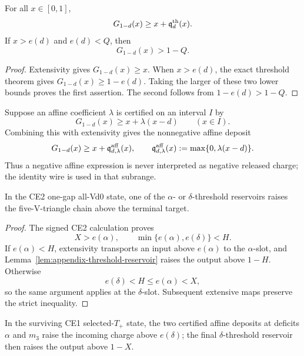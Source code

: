 \begin{lemma}
\label{lem:appendix-threshold-reservoir}
For all \(x\in[0,1]\),
\begin{equation}
 G_{1-d}(x)
 \ge x+\mathfrak q_d^{\rm th}(x).
 \label{eq:appendix-threshold-reservoir}
\end{equation}
If \(x>e(d)\) and \(e(d)<Q\), then
\[
 G_{1-d}(x)>1-Q.
\]
\end{lemma}

\begin{proof}
Extensivity gives \(G_{1-d}(x)\ge x\).  When \(x>e(d)\), the exact threshold
theorem gives \(G_{1-d}(x)\ge1-e(d)\).  Taking the larger of these two lower
bounds proves the first assertion.  The second follows from
\(1-e(d)>1-Q\).
\end{proof}

Suppose an affine coefficient \(\lambda\) is certified on an interval
\(I\) by
\[
 G_{1-d}(x)\ge x+\lambda(x-d)
 \qquad(x\in I).
\]
Combining this with extensivity gives the nonnegative affine deposit
\begin{equation}
 G_{1-d}(x)
 \ge x+\mathfrak q_{d,\lambda}^{\rm aff}(x),
 \qquad
 \mathfrak q_{d,\lambda}^{\rm aff}(x)
 :=\max\{0,\lambda(x-d)\}.
 \label{eq:appendix-affine-deposit}
\end{equation}
Thus a negative affine expression is never interpreted as negative released
charge; the identity wire is used in that subrange.

\begin{proposition}
\label{prop:appendix-ce2-one-hit-discharge}
In the CE2 one-gap all-Vd0 state, one of the \(\alpha\)- or
\(\delta\)-threshold reservoirs raises the five-V-triangle chain above the
terminal target.
\end{proposition}

\begin{proof}
The signed CE2 calculation proves
\[
 X>e(\alpha),
 \qquad
 \min\{e(\alpha),e(\delta)\}<H.
\]
If \(e(\alpha)<H\), extensivity transports an input above \(e(\alpha)\) to
the \(\alpha\)-slot, and Lemma~\ref{lem:appendix-threshold-reservoir} raises
the output above \(1-H\).  Otherwise
\[
 e(\delta)<H\le e(\alpha)<X,
\]
so the same argument applies at the \(\delta\)-slot.  Subsequent extensive
maps preserve the strict inequality.
\end{proof}

\begin{proposition}
\label{prop:appendix-ce1-deposit-cascade}
In the surviving CE1 selected-\(T_+\) state, the two certified affine deposits
at deficits \(\alpha\) and \(m_3\) raise the incoming charge above
\(e(\delta)\); the final \(\delta\)-threshold reservoir then raises the
output above \(1-X\).
\end{proposition}

